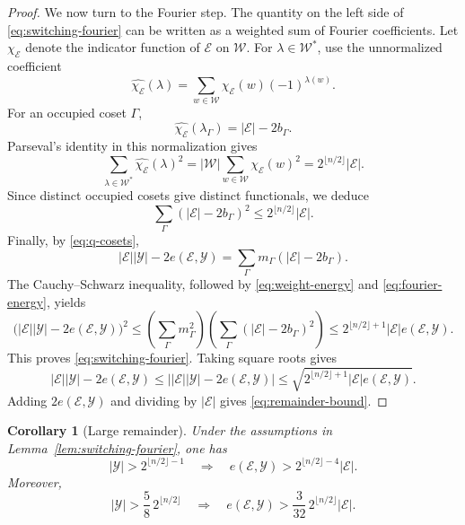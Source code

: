 \documentclass[11pt]{article}
\newtheorem{corollary}[theorem]{Corollary}
\begin{document}
\begin{proof}
We now turn to the Fourier step.  The quantity on the left side of
\eqref{eq:switching-fourier} can be written as a weighted sum of Fourier
coefficients.  Let \(\chi_{\mathcal E}\) denote the indicator function of
\(\mathcal E\) on \(\mathcal W\).  For \(\lambda\in\mathcal W^*\), use the
unnormalized coefficient
\[
 \widehat{\chi_{\mathcal E}}(\lambda)
 =
 \sum_{w\in\mathcal W}
 \chi_{\mathcal E}(w)(-1)^{\lambda(w)}.
\]
For an occupied coset \(\Gamma\),
\[
 \widehat{\chi_{\mathcal E}}(\lambda_\Gamma)
 =
 |\mathcal E|-2b_\Gamma.
\]
Parseval's identity in this normalization gives
\[
 \sum_{\lambda\in\mathcal W^*}
 \widehat{\chi_{\mathcal E}}(\lambda)^2
 =
 |\mathcal W|
 \sum_{w\in\mathcal W}\chi_{\mathcal E}(w)^2
 =
 2^{\lfloor n/2\rfloor}|\mathcal E|.
\]
Since distinct occupied cosets give distinct functionals, we deduce
\begin{equation}
 \sum_\Gamma (|\mathcal E|-2b_\Gamma)^2
 \le
 2^{\lfloor n/2\rfloor}|\mathcal E|.
\label{eq:fourier-energy}
\end{equation}
Finally, by \eqref{eq:q-cosets},
\[
 |\mathcal E||\mathcal Y|-2e(\mathcal E,\mathcal Y)
 =
 \sum_\Gamma m_\Gamma(|\mathcal E|-2b_\Gamma).
\]
The Cauchy--Schwarz inequality, followed by \eqref{eq:weight-energy} and
\eqref{eq:fourier-energy}, yields
\[
 \bigl(|\mathcal E||\mathcal Y|-2e(\mathcal E,\mathcal Y)\bigr)^2
 \le
 \left(\sum_\Gamma m_\Gamma^2\right)
 \left(\sum_\Gamma(|\mathcal E|-2b_\Gamma)^2\right)
 \le
 2^{\lfloor n/2\rfloor+1}|\mathcal E|e(\mathcal E,\mathcal Y).
\]
This proves \eqref{eq:switching-fourier}.  Taking square roots gives
\[
 |\mathcal E||\mathcal Y|-2e(\mathcal E,\mathcal Y)
 \le
 \bigl||\mathcal E||\mathcal Y|-2e(\mathcal E,\mathcal Y)\bigr|
 \le
 \sqrt{2^{\lfloor n/2\rfloor+1}|\mathcal E|e(\mathcal E,\mathcal Y)}.
\]
Adding \(2e(\mathcal E,\mathcal Y)\) and dividing by \(|\mathcal E|\) gives
\eqref{eq:remainder-bound}.
\end{proof}

\begin{corollary}[Large remainder]\label{cor:large-remainder}
Under the assumptions in Lemma~\ref{lem:switching-fourier}, one has
\[
 |\mathcal Y|>2^{\lfloor n/2\rfloor-1}
 \quad\Longrightarrow\quad
 e(\mathcal E,\mathcal Y)
 >
 2^{\lfloor n/2\rfloor-4}|\mathcal E|.
\]
Moreover,
\[
 |\mathcal Y|>\frac58\,2^{\lfloor n/2\rfloor}
 \quad\Longrightarrow\quad
 e(\mathcal E,\mathcal Y)
 >
 \frac{3}{32}\,2^{\lfloor n/2\rfloor}|\mathcal E|.
\]
\end{corollary}
\end{document}
